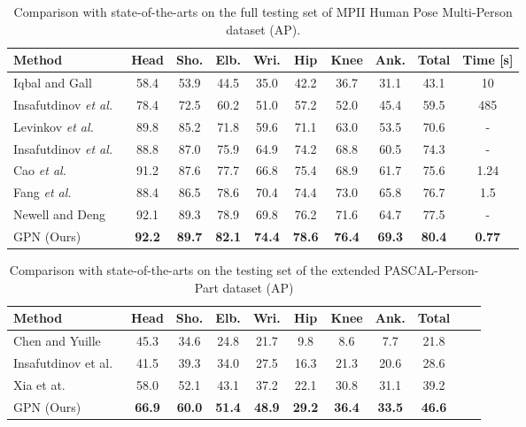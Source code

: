 \documentclass[10pt,twocolumn,letterpaper]{article}
\begin{document}
\begin{table}[t!]\scriptsize%
  \caption{Comparison with state-of-the-arts on the full testing set of MPII Human Pose Multi-Person dataset (AP).}
  \label{tab:exp_mpii_sota}
  \centering
  \setlength{\tabcolsep}{2pt}
  \begin{tabular}{lccccccccc}
    \toprule
    Method   &Head & Sho. & Elb. & Wri. & Hip & Knee  & Ank. & Total & Time [s]\\
    \midrule
    Iqbal and Gall~\cite{iqbal2016multi} & 58.4  & 53.9  & 44.5  & 35.0  & 42.2  & 36.7 & 31.1 & 43.1 & 10\\
    Insafutdinov \emph{et al.}~\cite{hpe:deepercut_eccv16} & 78.4  & 72.5  & 60.2  & 51.0  & 57.2  & 52.0 & 45.4 & 59.5 & 485\\
    Levinkov \emph{et al.}~\cite{levinkov2017joint} & 89.8 & 85.2 &	71.8 &	59.6 &	71.1 &	63.0 &	53.5 &	70.6 & - \\
    Insafutdinov \emph{et al.}~\cite{insafutdinov2016articulated} & 88.8  & 87.0  & 75.9  & 64.9  & 74.2  & 68.8 & 60.5 & 74.3 & - \\
    Cao \emph{et al.}~\cite{cao2017realtime} & 91.2  & 87.6  & 77.7  & 66.8  & 75.4  & 68.9 & 61.7 & 75.6 & 1.24\\
    Fang \emph{et al.}~\cite{fang16rmpe}& 88.4  & 86.5  & 78.6  & 70.4  & 74.4  & 73.0 & 65.8 & 76.7 & 1.5\\
    Newell and Deng~\cite{newell2016associative} & 92.1 & 89.3 & 78.9 & 69.8 & 76.2 & 71.6 & 64.7 & 77.5 & - \\
    \midrule
    GPN (Ours) & \textbf{92.2}  & \textbf{89.7}  & \textbf{82.1}  & \textbf{74.4}  & \textbf{78.6}  & \textbf{76.4} & \textbf{69.3} & \textbf{80.4} & \textbf{0.77} \\
    \bottomrule
  \end{tabular}
\end{table}

\begin{table}[t!]\footnotesize
    \caption{Comparison with state-of-the-arts on the testing set of the extended PASCAL-Person-Part dataset (AP)}
    \label{tab:exp_pascal_sota}
    \centering
    \setlength{\tabcolsep}{2pt}
    \begin{tabular}{lcccccccccc}
        \toprule
        Method &Head & Sho. & Elb. & Wri. & Hip & Knee  & Ank. & Total\\
        \midrule
        Chen and Yuille~\cite{chen2015parsing} & 45.3 & 34.6 & 24.8 & 21.7 & 9.8 & 8.6 & 7.7 &  21.8\\
        Insafutdinov et al.~\cite{hpe:deepercut_eccv16} & 41.5 & 39.3 & 34.0 & 27.5 & 16.3 & 21.3 & 20.6 &  28.6\\
        Xia et at.~\cite{xia2017joint} & 58.0 & 52.1 & 43.1 & 37.2 & 22.1 & 30.8 & 31.1 & 39.2\\
        \midrule
        GPN (Ours) & \textbf{66.9} & \textbf{60.0} & \textbf{51.4} & \textbf{48.9} & \textbf{29.2} & \textbf{36.4} & \textbf{33.5}  & \textbf{46.6} \\
        \bottomrule
    \end{tabular}
\end{table}
\end{document}
